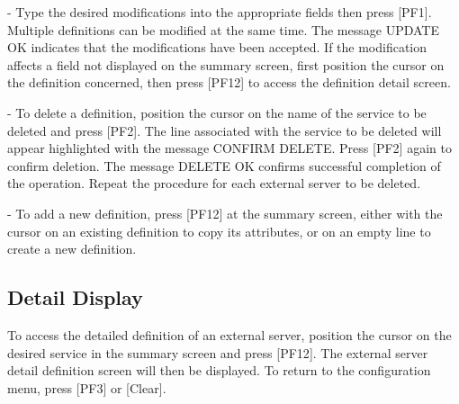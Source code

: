 \documentclass[letterpaper,10pt,english]{sphinxmanual}
\begin{document}
 - Type the desired modifications into the appropriate fields then press {[}PF1{]}. Multiple definitions can be modified at the same time. The message UPDATE OK indicates that the modifications have been accepted. If the modification affects a field not displayed on the summary screen, first position the cursor on the definition concerned, then press {[}PF12{]} to access the definition detail screen.

 - To delete a definition, position the cursor on the name of the service to be deleted and press {[}PF2{]}. The line associated with the service to be deleted will appear highlighted with the message CONFIRM DELETE. Press {[}PF2{]} again to confirm deletion. The message DELETE OK confirms successful completion of the operation. Repeat the procedure for each external server to be deleted.

 - To add a new definition, press {[}PF12{]} at the summary screen, either with the cursor on an existing definition to copy its attributes, or on an empty line to create a new definition.


\subsection{Detail Display}
\label{\detokenize{connectivity_guide:id70}}\label{\detokenize{connectivity_guide:index-133}}
To access the detailed definition of an external server, position the cursor on the desired service in the summary screen and press {[}PF12{]}. The external server detail definition screen will then be displayed. To return to the configuration menu, press {[}PF3{]} or {[}Clear{]}.


\end{document}
